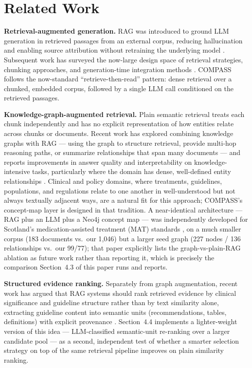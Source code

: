 \documentclass[11pt]{article}
\begin{document}
\section{Related Work}

\textbf{Retrieval-augmented generation.} RAG was introduced to ground LLM generation in retrieved passages from an external corpus, reducing hallucination and enabling source attribution without retraining the underlying model \citep{lewis2020rag}. Subsequent work has surveyed the now-large design space of retrieval strategies, chunking approaches, and generation-time integration methods \citep{gao2023ragsurvey}. COMPASS follows the now-standard ``retrieve-then-read'' pattern: dense retrieval over a chunked, embedded corpus, followed by a single LLM call conditioned on the retrieved passages.

\textbf{Knowledge-graph-augmented retrieval.} Plain semantic retrieval treats each chunk independently and has no explicit representation of how entities relate across chunks or documents. Recent work has explored combining knowledge graphs with RAG --- using the graph to structure retrieval, provide multi-hop reasoning paths, or summarize relationships that span many documents --- and reports improvements in answer quality and interpretability on knowledge-intensive tasks, particularly where the domain has dense, well-defined entity relationships \citep{edge2024graphrag}. Clinical and policy domains, where treatments, guidelines, populations, and regulations relate to one another in well-understood but not always textually adjacent ways, are a natural fit for this approach; COMPASS's concept-map layer is designed in that tradition. A near-identical architecture --- RAG plus an LLM plus a Neo4j concept map --- was independently developed for Scotland's medication-assisted treatment (MAT) standards \citep{scotlandmat2026}, on a much smaller corpus (183 documents vs.\ our 1{,}046) but a larger seed graph (227 nodes / 136 relationships vs.\ our 99/77); that paper explicitly lists the graph-vs-plain-RAG ablation as future work rather than reporting it, which is precisely the comparison Section~4.3 of this paper runs and reports.

\textbf{Structured evidence ranking.} Separately from graph augmentation, recent work has argued that RAG systems should rank retrieved evidence by clinical significance and guideline structure rather than by text similarity alone, extracting guideline content into semantic units (recommendations, tables, definitions) with explicit provenance \citep{clinicbot2026}. Section~4.4 implements a lighter-weight version of this idea --- LLM-classified semantic-unit re-ranking over a larger candidate pool --- as a second, independent test of whether a smarter selection strategy on top of the same retrieval pipeline improves on plain similarity ranking.
\end{document}
